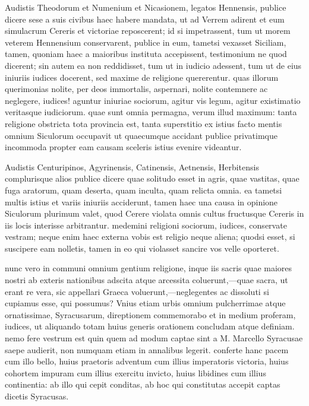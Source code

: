  Audistis Theodorum et Numenium et Nicasionem, legatos Hennensis, publice dicere sese a suis civibus haec habere mandata, ut ad Verrem adirent et eum simulacrum Cereris et victoriae reposcerent; id si impetrassent, tum ut morem veterem Hennensium conservarent, publice in eum, tametsi vexasset Siciliam, tamen, quoniam haec a maioribus instituta accepissent, testimonium ne quod dicerent; sin autem ea non reddidisset, tum ut in iudicio adessent, tum ut de eius iniuriis iudices docerent, sed maxime de religione quererentur. quas illorum querimonias nolite, per deos immortalis, aspernari, nolite contemnere ac neglegere, iudices! aguntur iniuriae sociorum, agitur vis legum, agitur existimatio veritasque iudiciorum. quae sunt omnia permagna, verum illud maximum: tanta religione obstricta tota provincia est, tanta superstitio ex istius facto mentis omnium Siculorum occupavit ut quaecumque accidant publice privatimque incommoda propter eam causam sceleris istius evenire videantur.

 Audistis Centuripinos, Agyrinensis, Catinensis, Aetnensis, Herbitensis complurisque alios publice dicere quae solitudo esset in agris, quae vastitas, quae fuga aratorum, quam deserta, quam inculta, quam relicta omnia. ea tametsi multis istius et variis iniuriis acciderunt, tamen haec una causa in opinione Siculorum plurimum valet, quod Cerere violata omnis cultus fructusque Cereris in iis locis interisse arbitrantur. medemini religioni sociorum, iudices, conservate vestram; neque enim haec externa vobis est religio neque aliena; quodsi esset, si suscipere eam nolletis, tamen in eo qui violasset sancire vos velle oporteret.

 nunc vero in communi omnium gentium religione, inque iis sacris quae maiores nostri ab exteris nationibus adscita atque arcessita coluerunt,—quae sacra, ut erant re vera, sic appellari Graeca voluerunt,—neglegentes ac dissoluti si cupiamus esse, qui possumus? Vnius etiam urbis omnium pulcherrimae atque ornatissimae, Syracusarum, direptionem commemorabo et in medium proferam, iudices, ut aliquando totam huius generis orationem concludam atque definiam. nemo fere vestrum est quin quem ad modum captae sint a M. Marcello Syracusae saepe audierit, non numquam etiam in annalibus legerit. conferte hanc pacem cum illo bello, huius praetoris adventum cum illius imperatoris victoria, huius cohortem impuram cum illius exercitu invicto, huius libidines cum illius continentia: ab illo qui cepit conditas, ab hoc qui constitutas accepit captas dicetis Syracusas.


